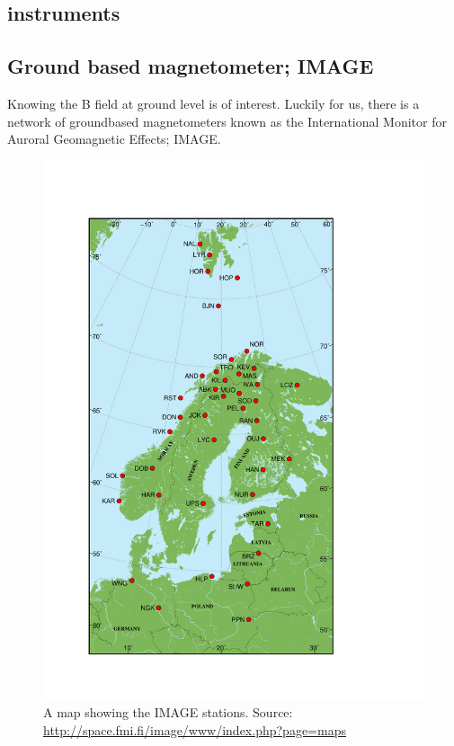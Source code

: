 \documentclass[norsk,a4paper,11pt]{article}
\begin{document}
\begin{multicols}{2}
\section{instruments} %
\label{sec:instruments}
\subsection{Ground based magnetometer; IMAGE}
Knowing the B field at ground level is of interest. Luckily for us, there is a network of groundbased magnetometers known as the International Monitor for Auroral Geomagnetic Effects; IMAGE.\\
\begin{figure}[H]
	\includegraphics[scale = 0.4]{Figures/magnetometer_map.pdf}
	\centering
	\caption{A map showing the IMAGE stations. Source: \url{http://space.fmi.fi/image/www/index.php?page=maps}}
	\label{fig::image_map}
\end{figure}


\end{multicols}
\end{document}
